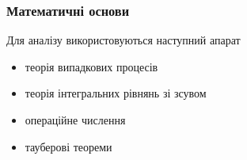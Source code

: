 
\begin{frame}
	\manimate
	\frametitle{Математичні основи}
\begin{block}{Для аналізу використовуються наступний апарат}
	\begin{itemize}
		\item теорія випадкових процесів
		\item теорія інтегральних рівнянь зі зсувом
		\item операційне числення
		\item тауберові теореми
	\end{itemize}
\end{block}
\end{frame}
